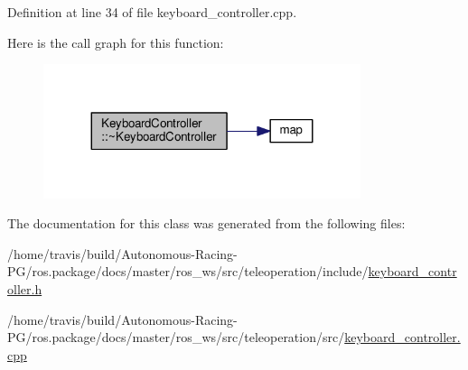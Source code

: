 Definition at line 34 of file keyboard\+\_\+controller.\+cpp.



Here is the call graph for this function\+:
\nopagebreak
\begin{figure}[H]
\begin{center}
\leavevmode
\includegraphics[width=263pt]{class_keyboard_controller_a9791aa6d6fadf77b4ef3e59cdb7d9b1d_cgraph}
\end{center}
\end{figure}




The documentation for this class was generated from the following files\+:\begin{DoxyCompactItemize}
\item 
/home/travis/build/\+Autonomous-\/\+Racing-\/\+P\+G/ros.\+package/docs/master/ros\+\_\+ws/src/teleoperation/include/\hyperlink{keyboard__controller_8h}{keyboard\+\_\+controller.\+h}\item 
/home/travis/build/\+Autonomous-\/\+Racing-\/\+P\+G/ros.\+package/docs/master/ros\+\_\+ws/src/teleoperation/src/\hyperlink{keyboard__controller_8cpp}{keyboard\+\_\+controller.\+cpp}\end{DoxyCompactItemize}
